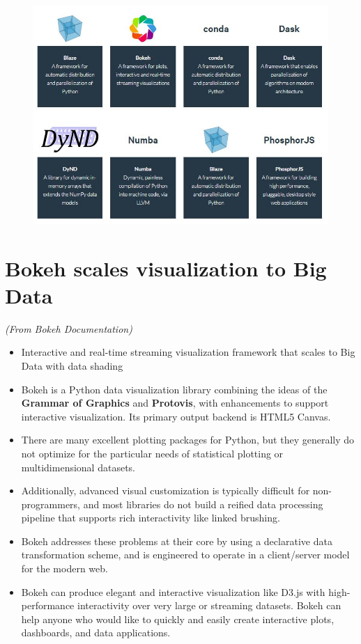 \documentclass[a4paper,12pt]{article}
\begin{document}
\begin{figure}[h!]
\centering
\includegraphics[width=0.9\linewidth]{images/00-continuum-projects}
\end{figure}
\newpage
\section*{Bokeh scales visualization to Big Data}
\textit{(From Bokeh Documentation)}
\begin{itemize}
\item Interactive and real-time streaming visualization framework that scales to Big Data with data shading

\item Bokeh is a Python data visualization library combining the ideas of the \textbf{Grammar of Graphics} and \textbf{Protovis}, with enhancements to support interactive visualization. Its primary output backend is HTML5 Canvas.

\item There are many excellent plotting packages for Python, but they generally do not optimize for the particular needs of statistical plotting or multidimensional datasets. 
\item Additionally, advanced visual customization is typically difficult for non-programmers, and most libraries do not build a reified data processing pipeline that supports rich interactivity like linked brushing. 
\item Bokeh addresses these problems at their core by using a declarative data transformation scheme, and is engineered to operate in a client/server model for the modern web.


\item Bokeh can produce elegant and interactive visualization like D3.js with high-performance interactivity over very large or streaming datasets. Bokeh can help anyone who would like to quickly and easily create interactive plots, dashboards, and data applications.
\end{itemize}
\end{document}
